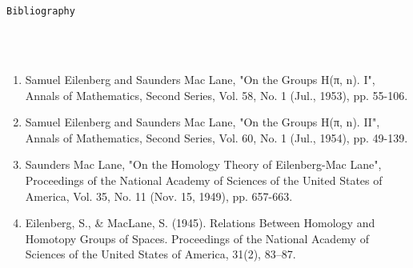 \documentclass{book}
\theoremstyle{definition}
\renewcommand{\chapter}[1]{
\newpage
{
\Huge 
\begin{center}
\ \\
\ \\
\thispagestyle{empty}
\texttt{#1}
\end{center}}
\ \\
\ \\
}
\begin{document}
\newpage
\chapter{Bibliography}

\begin{enumerate}
\item Samuel Eilenberg and Saunders Mac Lane, "On the Groups H(π, n). I", Annals of Mathematics, Second Series, Vol. 58, No. 1 (Jul., 1953), pp. 55-106.
\item Samuel Eilenberg and Saunders Mac Lane, "On the Groups H(π, n). II", Annals of Mathematics, Second Series, Vol. 60, No. 1 (Jul., 1954), pp. 49-139.
\item Saunders Mac Lane, "On the Homology Theory of Eilenberg-Mac Lane", Proceedings of the National Academy of Sciences of the United States of America, Vol. 35, No. 11 (Nov. 15, 1949), pp. 657-663.
\item Eilenberg, S., \& MacLane, S. (1945). Relations Between Homology and Homotopy Groups of Spaces. Proceedings of the National Academy of Sciences of the United States of America, 31(2), 83–87. 
\end{enumerate}





\newpage
\ \\
\thispagestyle{empty}
\pagecolor{Yellow}
\end{document}
